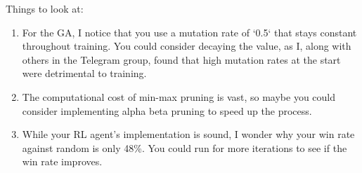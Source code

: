 Things to look at:
\begin{enumerate}
    \item For the GA, I notice that you use a mutation rate of `0.5` that stays constant throughout training. You could consider decaying the value, as I, along with others in the Telegram group, found that high mutation rates at the start were detrimental to training.
    \item The computational cost of min-max pruning is vast, so maybe you could consider implementing alpha beta pruning to speed up the process.
    \item While your RL agent's implementation is sound, I wonder why your win rate against random is only 48\%. You could run for more iterations to see if the win rate improves.
\end{enumerate}